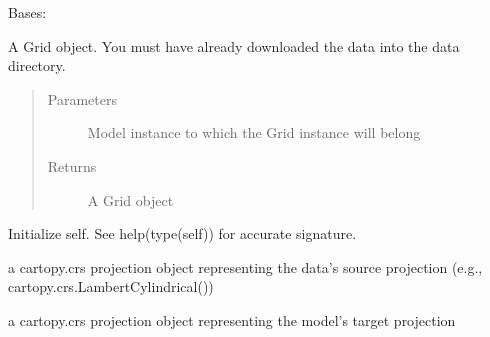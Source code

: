 \documentclass[letterpaper,10pt,english]{sphinxmanual}
\begin{document}
\begin{fulllineitems}
\label{\detokenize{octapy:octapy.tracking.Grid}}
\sphinxAtStartPar
Bases: 

\sphinxAtStartPar
A Grid object. You must have already downloaded the data into the data
directory.
\begin{quote}\begin{description}
\item[{Parameters}] \leavevmode
\sphinxAtStartPar
{} \textendash{} Model instance to which the Grid instance will belong

\item[{Returns}] \leavevmode
\sphinxAtStartPar
A Grid object

\end{description}\end{quote}

\begin{fulllineitems}
\label{\detokenize{octapy:octapy.tracking.Grid.__init__}}
\sphinxAtStartPar
Initialize self.  See help(type(self)) for accurate signature.

\end{fulllineitems}


\begin{fulllineitems}
\label{\detokenize{octapy:octapy.tracking.Grid.src_crs}}
\sphinxAtStartPar
a cartopy.crs projection object representing the data’s source 
projection (e.g., cartopy.crs.LambertCylindrical())

\end{fulllineitems}


\begin{fulllineitems}
\label{\detokenize{octapy:octapy.tracking.Grid.tgt_crs}}
\sphinxAtStartPar
a cartopy.crs projection object representing the model’s target 
projection


\end{fulllineitems}
\end{fulllineitems}
\end{document}

